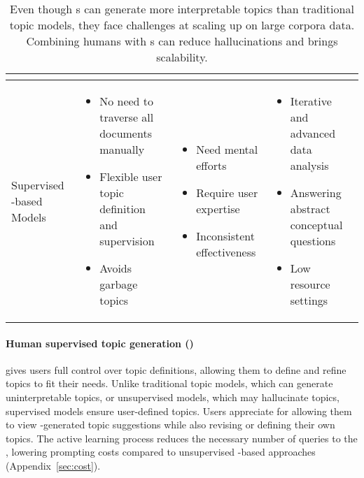\begin{table*}[h!]
\begin{tabular}{>{\centering\arraybackslash}m{} m{} m{} m{}}
\begin{itemize}[leftmargin=*,noitemsep,topsep=0pt]
\end{itemize} \\
\midrule
Supervised \mm{}-based Models &
\begin{itemize}[leftmargin=*,noitemsep,topsep=0pt]
\item No need to traverse all documents manually
\item Flexible user topic definition and supervision
\item Avoids garbage topics
\end{itemize} &
\begin{itemize}[leftmargin=*,noitemsep,topsep=0pt]
\item Need mental efforts
\item Require user expertise
\item Inconsistent effectiveness
\end{itemize} &
\begin{itemize}[leftmargin=*,noitemsep,topsep=0pt]
\item Iterative and advanced data analysis
\item Answering abstract conceptual questions
\item Low resource settings
\end{itemize} \\
\bottomrule
\end{tabular}
\caption{Even though \mm{}s can generate more interpretable topics than traditional topic models, they face challenges at scaling up on large corpora data. Combining humans with \mm{}s can reduce \mm{} hallucinations and brings scalability.}
\label{tab:topic_modeling_comparison}
\end{table*}

\paragraph{Human supervised \mm{} topic generation (\bass{})} gives users full control over topic definitions, allowing them to define and refine topics to fit their needs.
%
Unlike traditional topic models, which can generate uninterpretable
topics, or unsupervised \mm{} models, which may hallucinate
topics, supervised models ensure user-defined topics. %
%
Users appreciate \bass{} for allowing them to view \mm{}-generated topic
suggestions while also revising or defining their own topics.%
%
The active learning process reduces the necessary number of queries to the \mm{}, lowering prompting costs compared to unsupervised \mm{}-based approaches (Appendix~\ref{sec:cost}).


